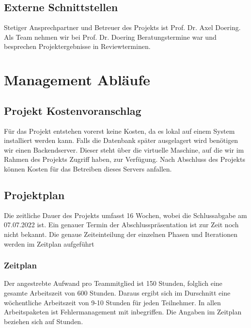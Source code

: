 \documentclass[12pt,a4paper,onecolumn]{article}
\begin{document}
\subsection{Externe Schnittstellen}
Stetiger Ansprechpartner und Betreuer des Projekts ist Prof. Dr. Axel Doering. Als Team nehmen wir bei Prof. Dr. Doering Beratungstermine war und besprechen Projektergebnisse in Reviewterminen. 

\section{Management Abläufe}
\subsection{Projekt Kostenvoranschlag}
Für das Projekt entstehen vorerst keine Kosten, da es lokal auf einem System installiert werden kann. Falls die Datenbank später ausgelagert wird benötigen wir
einen Backendserver. Dieser steht über die virtuelle Maschine, auf die wir im Rahmen des Projekts Zugriff haben, zur Verfügung. Nach Abschluss des Projekts können Kosten für das Betreiben dieses Servers anfallen.
\subsection{Projektplan}
Die zeitliche Dauer des Projekts umfasst 16 Wochen, wobei die Schlussabgabe am 07.07.2022 ist. Ein genauer Termin der Abschlusspräsentation ist zur Zeit noch nicht bekannt. Die genaue Zeiteinteilung der einzelnen Phasen und Iterationen werden im Zeitplan aufgeführt
\subsubsection{Zeitplan}
Der angestrebte Aufwand pro Teammitglied ist 150 Stunden, folglich eine gesamte Arbeitszeit von 600 Stunden. Daraus ergibt sich im Durschnitt eine wöchentliche Arbeitszeit von 9-10 Stunden für jeden Teilnehmer. In allen Arbeitspaketen ist Fehlermanagement mit inbegriffen. Die Angaben im Zeitplan beziehen sich auf Stunden.\\
\end{document}
